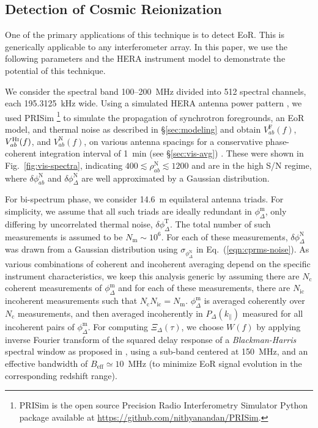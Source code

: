 \documentclass[
reprint,
superscriptaddress,
amsmath,
amssymb,
aps,
prd
]{revtex4-1}
\begin{document}
\subsection{Detection of Cosmic Reionization}\label{sec:EoR-detection}

One of the primary applications of this technique is to detect EoR. This is generically applicable to any interferometer array. In this paper, we use the following parameters and the HERA instrument model to demonstrate the potential of this technique.

We consider the spectral band 100--200~MHz divided into 512 spectral channels, each 195.3125~kHz wide. Using a simulated HERA antenna power pattern \cite{deb17}, we used PRISim \footnote{PRISim is the open source Precision Radio Interferometry Simulator Python package available at \href{https://github.com/nithyanandan/PRISim}{https://github.com/nithyanandan/PRISim}.} to simulate the propagation of synchrotron foregrounds, an EoR model, and thermal noise as described in \S\ref{sec:modeling} and obtain $V_{ab}^\textrm{F}(f)$, $V_{ab}^\textrm{H{\sc i}}(f)$, and $V_{ab}^\textrm{N}(f)$, on various antenna spacings for a conservative phase-coherent integration interval of 1~min (see \S\ref{sec:vis-avg}) \cite{car18}. These were shown in Fig.~\ref{fig:vis-spectra}, indicating $400\lesssim \rho_{ab}^\textrm{N} \lesssim 1200$ and are in the high S/N regime, where $\delta\phi_{ab}^\textrm{N}$ and $\delta\phi_\Delta^\textrm{N}$ are well approximated by a Gaussian distribution. 

For bi-spectrum phase, we consider 14.6~m equilateral antenna triads. For simplicity, we assume that all such triads are ideally redundant in $\phi_\Delta^\textrm{m}$, only differing by uncorrelated thermal noise, $\delta\phi_\Delta^\textrm{T}$. The total number of such measurements is assumed to be $N_\textrm{m} \sim 10^6$. For each of these measurements, $\delta\phi_\Delta^\textrm{N}$ was drawn from a Gaussian distribution using $\sigma_{\phi_\Delta^\textrm{N}}$ in Eq.~(\ref{eqn:cprms-noise}). As various combinations of coherent and incoherent averaging depend on the specific instrument characteristics, we keep this analysis generic by assuming there are $N_\textrm{c}$ coherent measurements of $\phi_\Delta^\textrm{m}$ and for each of these measurements, there are $N_\textrm{ic}$ incoherent measurements such that $N_\textrm{c}N_\textrm{ic}=N_\textrm{m}$. $\phi_\Delta^\textrm{m}$ is averaged coherently over $N_\textrm{c}$ measurements, and then averaged incoherently in $P_\Delta(k_\parallel)$ measured for all incoherent pairs of $\phi_\Delta^\textrm{m}$. For computing $\Xi_\Delta(\tau)$, we choose $W(f)$ by applying inverse Fourier transform of the squared delay response of a {\it Blackman-Harris} spectral window \cite{har78} as proposed in \cite{thy16}, using a sub-band centered at 150~MHz, and an effective bandwidth of $B_\textrm{eff}\simeq 10$~MHz (to minimize EoR signal evolution in the corresponding redshift range).
\end{document}
